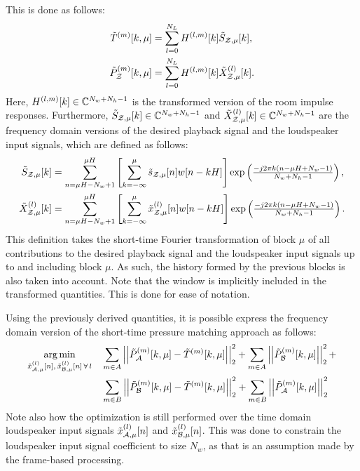 This is done as follows:
\begin{align}
    \tilde{T}^{(m)}[k, \mu] &= 
    \sum_{l=0}^{N_L}H^{(l,m)}[k]\tilde{S}_{\mathcal{Z},\mu}[k],\label{eq:perceptual_sound_zones:stft:t_freq} \\
    \tilde{P}_{\mathcal{Z}}^{(m)}[k, \mu] &= 
    \sum_{l=0}^{N_L}H^{(l,m)}[k]\tilde{X}^{(l)}_{\mathcal{Z},\mu}[k]. \label{eq:perceptual_sound_zones:stft:p_freq} 
\end{align}
Here, $H^{(l,m)}[k]\in\mathbb{C}^{N_w + N_h - 1}$ is the transformed version of the room impulse responses.
Furthermore, $\tilde{S}_{\mathcal{Z},\mu}[k]\in\mathbb{C}^{N_w + N_h - 1}$ and 
$\tilde{X}^{(l)}_{\mathcal{Z},\mu}[k]\in\mathbb{C}^{N_w + N_h - 1}$ are the frequency domain versions of
the desired playback signal and the loudspeaker input signals, which are defined as follows:
\begin{align}
    \tilde{S}_{\mathcal{Z},\mu}[k] &= 
    \sum_{n=\mu H - N_w + 1}^{\mu H}\left[\sum_{k=-\infty}^{\mu}\tilde{s}_{\mathcal{Z},\mu}[n]w[n - kH]\right]
    \exp\left({\textstyle\frac{-j2\pi k \left(n - \mu H + N_w - 1\right)}{N_w + N_h - 1}}\right), \\
    \tilde{X}^{(l)}_{\mathcal{Z},\mu}[k] &= 
    \sum_{n=\mu H - N_w + 1}^{\mu H}\left[\sum_{k=-\infty}^{\mu}\tilde{x}^{(l)}_{\mathcal{Z},\mu}[n]w[n - kH]\right]
    \exp\left({\textstyle\frac{-j2\pi k \left(n - \mu H + N_w - 1\right)}{N_w + N_h - 1}}\right).
\end{align}
This definition takes the short-time Fourier transformation of block $\mu$ of all contributions to the desired playback signal and the loudspeaker input signals up to and including block $\mu$. 
As such, the history formed by the previous blocks is also taken into account.
Note that the window is implicitly included in the transformed quantities.
This is done for ease of notation.

Using the previously derived quantities, it is possible express the frequency domain version of the short-time pressure matching approach as follows:
\begin{align}
    \begin{aligned}
    \argmin{\tilde{x}_{\za,\mu}^{(l)}[n],\,\tilde{x}_{\zb,\mu}^{(l)}[n]\,\forall\,l}{
       &\sum_{m\in A} \norm[2][2]{\tilde{P}_{\za}^{(m)}[k,\mu] - \tilde{T}^{(m)}[k,\mu]} +
        \sum_{m\in A} \norm[2][2]{\tilde{P}_{\zb}^{(m)}[k,\mu]} + \\
       &\sum_{m\in B} \norm[2][2]{\tilde{P}_{\zb}^{(m)}[k,\mu] - \tilde{T}^{(m)}[k,\mu]} + 
        \sum_{m\in B} \norm[2][2]{\tilde{P}_{\za}^{(m)}[k,\mu]}
    }
    \end{aligned}
    \label{eq:perceptual_sound_zone:stft:stft_pm}
\end{align}
Note also how the optimization is still performed over the time domain loudspeaker input signals 
$\tilde{x}_{\mathcal{A},\mu}^{(l)}[n]$ and $\tilde{x}_{\mathcal{B},\mu}^{(l)}[n]$.
This was done to constrain the loudspeaker input signal coefficient to size $N_w$, as that is an assumption made by the frame-based processing.

